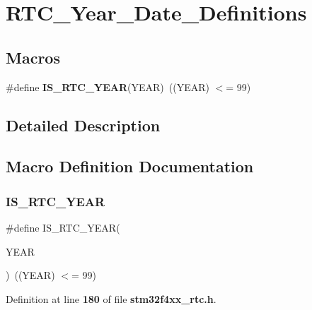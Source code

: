 \section{R\+T\+C\+\_\+\+Year\+\_\+\+Date\+\_\+\+Definitions}
\label{group__RTC__Year__Date__Definitions}
\subsection*{Macros}
\begin{DoxyCompactItemize}
\item 
\#define \textbf{ I\+S\+\_\+\+R\+T\+C\+\_\+\+Y\+E\+AR}(Y\+E\+AR)~((Y\+E\+AR) $<$= 99)
\end{DoxyCompactItemize}


\subsection{Detailed Description}


\subsection{Macro Definition Documentation}
\mbox{\label{group__RTC__Year__Date__Definitions_gae59c9cfe6f9532ab26d74c25bcbe814b}} 
\subsubsection{I\+S\+\_\+\+R\+T\+C\+\_\+\+Y\+E\+AR}
{\footnotesize\ttfamily \#define I\+S\+\_\+\+R\+T\+C\+\_\+\+Y\+E\+AR(\begin{DoxyParamCaption}\item[{}]{Y\+E\+AR }\end{DoxyParamCaption})~((Y\+E\+AR) $<$= 99)}



Definition at line \textbf{ 180} of file \textbf{ stm32f4xx\+\_\+rtc.\+h}.

